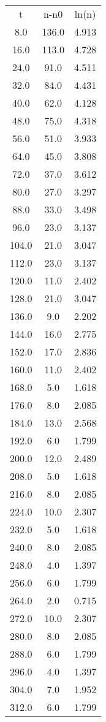 \begin{table}
\begin{tabular}{ccc}
t & n-n0 & ln(n) \\
8.0 & 136.0 & 4.913 \\
16.0 & 113.0 & 4.728 \\
24.0 & 91.0 & 4.511 \\
32.0 & 84.0 & 4.431 \\
40.0 & 62.0 & 4.128 \\
48.0 & 75.0 & 4.318 \\
56.0 & 51.0 & 3.933 \\
64.0 & 45.0 & 3.808 \\
72.0 & 37.0 & 3.612 \\
80.0 & 27.0 & 3.297 \\
88.0 & 33.0 & 3.498 \\
96.0 & 23.0 & 3.137 \\
104.0 & 21.0 & 3.047 \\
112.0 & 23.0 & 3.137 \\
120.0 & 11.0 & 2.402 \\
128.0 & 21.0 & 3.047 \\
136.0 & 9.0 & 2.202 \\
144.0 & 16.0 & 2.775 \\
152.0 & 17.0 & 2.836 \\
160.0 & 11.0 & 2.402 \\
168.0 & 5.0 & 1.618 \\
176.0 & 8.0 & 2.085 \\
184.0 & 13.0 & 2.568 \\
192.0 & 6.0 & 1.799 \\
200.0 & 12.0 & 2.489 \\
208.0 & 5.0 & 1.618 \\
216.0 & 8.0 & 2.085 \\
224.0 & 10.0 & 2.307 \\
232.0 & 5.0 & 1.618 \\
240.0 & 8.0 & 2.085 \\
248.0 & 4.0 & 1.397 \\
256.0 & 6.0 & 1.799 \\
264.0 & 2.0 & 0.715 \\
272.0 & 10.0 & 2.307 \\
280.0 & 8.0 & 2.085 \\
288.0 & 6.0 & 1.799 \\
296.0 & 4.0 & 1.397 \\
304.0 & 7.0 & 1.952 \\
312.0 & 6.0 & 1.799 \\

\end{tabular}
\end{table}
